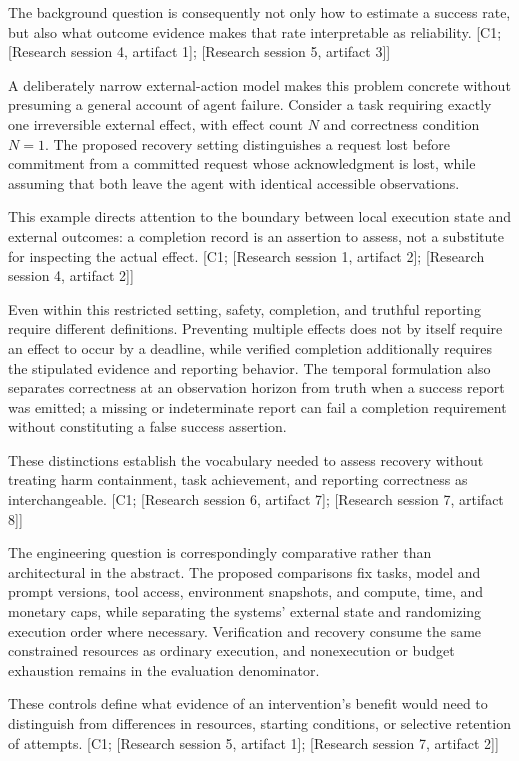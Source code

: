 \documentclass[11pt]{article}
\begin{document}
The background question is consequently not only how to estimate a success rate, but also what outcome evidence makes that rate interpretable as reliability. [C1; [Research session 4, artifact 1]; [Research session 5, artifact 3]]

A deliberately narrow external-action model makes this problem concrete without presuming a general account of agent failure. Consider a task requiring exactly one irreversible external effect, with effect count $N$ and correctness condition $N=1$. The proposed recovery setting distinguishes a request lost before commitment from a committed request whose acknowledgment is lost, while assuming that both leave the agent with identical accessible observations.

This example directs attention to the boundary between local execution state and external outcomes: a completion record is an assertion to assess, not a substitute for inspecting the actual effect. [C1; [Research session 1, artifact 2]; [Research session 4, artifact 2]]

Even within this restricted setting, safety, completion, and truthful reporting require different definitions. Preventing multiple effects does not by itself require an effect to occur by a deadline, while verified completion additionally requires the stipulated evidence and reporting behavior. The temporal formulation also separates correctness at an observation horizon from truth when a success report was emitted; a missing or indeterminate report can fail a completion requirement without constituting a false success assertion.

These distinctions establish the vocabulary needed to assess recovery without treating harm containment, task achievement, and reporting correctness as interchangeable. [C1; [Research session 6, artifact 7]; [Research session 7, artifact 8]]

The engineering question is correspondingly comparative rather than architectural in the abstract. The proposed comparisons fix tasks, model and prompt versions, tool access, environment snapshots, and compute, time, and monetary caps, while separating the systems\textquoteright{} external state and randomizing execution order where necessary. Verification and recovery consume the same constrained resources as ordinary execution, and nonexecution or budget exhaustion remains in the evaluation denominator.

These controls define what evidence of an intervention\textquoteright{}s benefit would need to distinguish from differences in resources, starting conditions, or selective retention of attempts. [C1; [Research session 5, artifact 1]; [Research session 7, artifact 2]]
\end{document}
